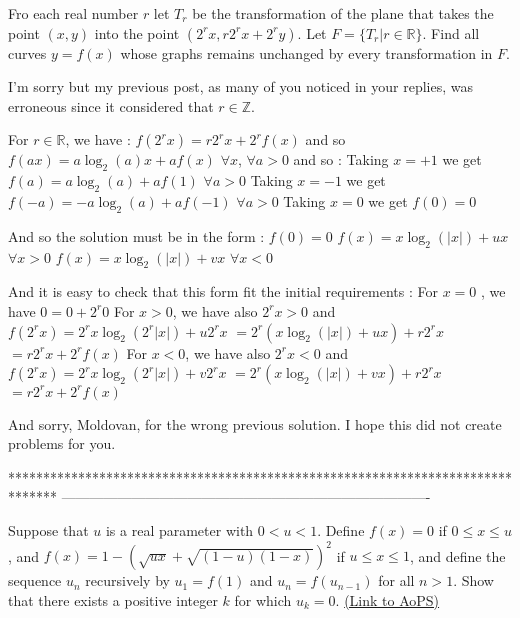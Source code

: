 \begin{solution}
	\begin{tcolorbox}Fro each real number $ r$ let $ T_r$ be the transformation of the plane that takes the point $ (x,y)$ into the point $ (2^r x,r 2^r x + 2^r y)$. Let $ F = \{ T_r | r \in \mathbb{R} \}$. Find all curves $ y = f(x)$ whose graphs remains unchanged by every transformation in $ F$.\end{tcolorbox}

I'm sorry but my previous post, as many of you noticed in your replies, was erroneous since it considered that $ r\in\mathbb Z$.

For $ r\in\mathbb R$, we have :
$ f(2^rx) = r2^rx + 2^rf(x)$ and so $ f(ax) = a\log_2(a)x + af(x)$ $ \forall x$, $ \forall a > 0$ and so :
Taking $ x = + 1$ we get $ f(a) = a\log_2(a) + af(1)$ $ \forall a > 0$
Taking $ x = - 1$ we get $ f( - a) = - a\log_2(a) + af( - 1)$ $ \forall a > 0$
Taking $ x = 0$ we get $ f(0) = 0$

And so the solution must be in the form :
$ f(0) = 0$
$ f(x) = x\log_2(|x|) + ux$ $ \forall x > 0$
$ f(x) = x\log_2(|x|) + vx$ $ \forall x < 0$

And it is easy to check that this form fit the initial requirements :
For $ x = 0$ , we have $ 0 = 0 + 2^r0$
For $ x > 0$, we have also $ 2^rx > 0$ and $ f(2^rx) = 2^rx\log_2(2^r|x|) + u2^rx$ $ = 2^r(x\log_2(|x|) + ux) + r2^rx$ $ = r2^rx + 2^rf(x)$
For $ x < 0$, we have also $ 2^rx < 0$ and $ f(2^rx) = 2^rx\log_2(2^r|x|) + v2^rx$ $ = 2^r(x\log_2(|x|) + vx) + r2^rx$ $ = r2^rx + 2^rf(x)$

And sorry, Moldovan, for the wrong previous solution. I hope this did not create problems for you.
\end{solution}
*******************************************************************************
-------------------------------------------------------------------------------

\begin{problem}
	Suppose that $ u$ is a real parameter with $ 0<u<1$. Define $ f(x)=0$ if $ 0 \le x \le u$, and $ f(x)=1-(\sqrt{ux}+\sqrt{(1-u)(1-x)})^2$ if $ u \le x \le 1$, and define the sequence $ u_n$ recursively by $ u_1=f(1)$ and $ u_n=f(u_{n-1})$ for all $ n >1$. Show that there exists a positive integer $ k$ for which $ u_k=0$.
	\flushright \href{https://artofproblemsolving.com/community/c6h285072}{(Link to AoPS)}
\end{problem}



